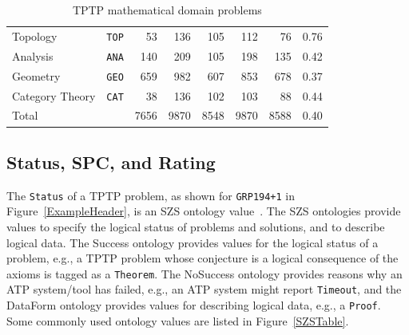 \documentclass[runningheads]{llncs}
\begin{document}
\begin{table}[tb]
\begin{center}
\begin{tabular}{lr|rr|rrrr}
Topology            & {\tt TOP} &   53 &  136 &  105 &  112 &   76 & 0.76 \\
Analysis            & {\tt ANA} &  140 &  209 &  105 &  198 &  135 & 0.42 \\
Geometry            & {\tt GEO} &  659 &  982 &  607 &  853 &  678 & 0.37 \\
Category Theory     & {\tt CAT} &   38 &  136 &  102 &  103 &   88 & 0.44 \\
\hline
Total               &           & 7656 & 9870 & 8548 & 9870 & 8588 & 0.40 \\
\end{tabular}
\end{center}
\caption{TPTP mathematical domain problems}
\label{Domains}
\end{table}

\subsection{Status, SPC, and Rating}
\label{Characteristics}

The {\tt Status} of a TPTP problem, as shown for {\tt GRP194+1} in Figure~\ref{ExampleHeader}, is 
an SZS ontology value~\cite{Sut08-KEAPPA}.
The SZS ontologies provide values to specify the logical status of problems and solutions, and 
to describe logical data.
The Success ontology provides values for the logical status of a problem, e.g., a TPTP problem 
whose conjecture is a logical consequence of the axioms is tagged as a {\tt Theorem}.
The NoSuccess ontology provides reasons why an ATP system/tool has failed, e.g., an ATP system 
might report {\tt Timeout}, and the DataForm ontology provides values for describing logical 
data, e.g., a {\tt Proof}.
Some commonly used ontology values are listed in Figure~\ref{SZSTable}.

\end{document}
